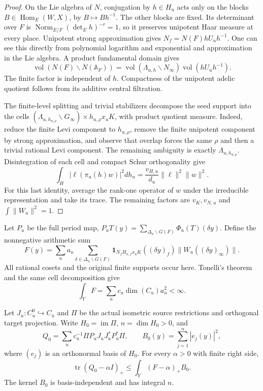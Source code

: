 \begin{proof}
On the Lie algebra of \(N\), conjugation by \(h\in H_u\) acts only
on the blocks \(B\in\operatorname{Hom}_E(W,X)\), by
\(B\mapsto Bh^{-1}\). The other blocks are fixed. Its determinant
over \(F\) is \(\operatorname{Norm}_{E/F}(\det_Eh)^{-r}=1\),
so it preserves unipotent Haar measure at every place.
Unipotent strong approximation gives \(N_f=N(F)hU_uh^{-1}\).
One can see this directly from polynomial logarithm and exponential
and approximation in the Lie algebra. A product fundamental domain gives
\[
 \operatorname{vol}(N(F)\backslash N(\mathbb A_F))
 =\operatorname{vol}(\Lambda_{u,h}\backslash N_\infty)
                  \operatorname{vol}(hU_uh^{-1}).
\]
The finite factor is independent of \(h\). Compactness of the
unipotent adelic quotient follows from its additive central filtration.

The finite-level splitting and trivial stabilizers decompose the seed
support into the cells
\((\Lambda_{u,h_{u,\rho}}\backslash G_\infty)
\times h_{u,\rho}x_uK\), with product quotient measure.
Indeed, reduce the finite Levi component to \(h_{u,\rho}\), remove
the finite unipotent component by strong approximation, and observe
that overlap forces the same \(\rho\) and then a trivial rational
Levi component. The remaining ambiguity is exactly \(\Lambda_{u,h_{u,\rho}}\).
Disintegration of each cell and compact Schur orthogonality give
\[
 \int_H|\ell(\pi_u(h)w)|^2dh_u
       =\frac{v_{H,u}}{d_u}\|\ell\|^2\|w\|^2.
\]
For this last identity, average the rank-one operator of \(w\) under
the irreducible representation and take its trace. The remaining
factors are \(v_K,v_{N,u}\) and \(\int\|W_u\|^2=1\).
\end{proof}

Let \(P_u\) be the full period map,
\(P_uT(y)=\sum_{\Delta_u\backslash G(F)}\Phi_u(T)(\delta y)\).
Define the nonnegative arithmetic sum
\[
 F(y)=\sum_u a_u\sum_{\delta\in\Delta_u\backslash G(F)}
 \mathbf1_{N_fH_{u,f}x_uK}((\delta y)_f)
                  \|W_u((\delta y)_\infty)\|.
\]
All rational cosets and the original finite supports occur here.
Tonelli's theorem and the same cell decomposition give
\[
 \int_YF=\sum_u c_u\dim(C_u)a_u^2<\infty.
\]

\begin{theorem}
\label{shared-whittaker-scalar-envelope}
Let \(J_u:C_u^0\hookrightarrow C_u\) and \(\Pi\) be the actual
isometric source restrictions and orthogonal target projection. Write
\(H_0=\operatorname{im}\Pi\), \(n=\dim H_0>0\), and
\[
 Q_0=\sum_u c_u^{-1}\Pi P_uJ_uJ_u^*P_u^*\Pi,
 \qquad B_0(y)=\sum_{j=1}^n|e_j(y)|^2,
\]
where \((e_j)\) is an orthonormal basis of \(H_0\). For every
\(\alpha>0\) with finite right side,
\begin{equation}\label{shared-whittaker-excess}
 \operatorname{tr}(Q_0-\alpha I)_+
       \le\int_Y(F-\alpha)_+B_0.
\end{equation}
The kernel \(B_0\) is basis-independent and has integral \(n\).
\end{theorem}

